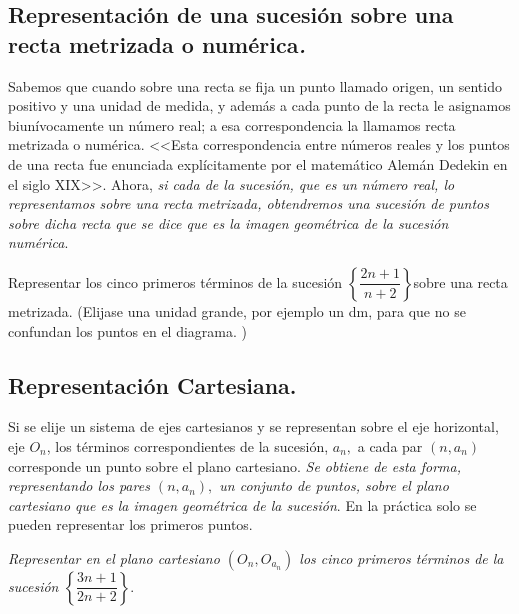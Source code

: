 \documentclass[oneside,english,spanish,2m,twoside,svgnames,x11names,HTML,twoside,12pt]{libro-matua}\usepackage[]{graphicx}\usepackage[]{color}
\begin{document}
\subsection{Representación de una sucesión sobre una recta metrizada o numérica\textsl{.}}
\begin{flushleft}
Sabemos que cuando sobre una recta se fija un punto llamado origen,
un sentido positivo y una unidad de medida, y además a cada punto
de la recta le asignamos biunívocamente un número real; a esa correspondencia
la llamamos recta metrizada o numérica. <<Esta correspondencia entre
números reales y los puntos de una recta fue enunciada explícitamente
por el matemático Alemán Dedekin en el siglo XIX>>.\linebreak{}
Ahora, \textsl{si cada de la sucesión, que es un número real, lo representamos
sobre una recta metrizada, obtendremos una sucesión de puntos sobre
dicha recta que se dice que es la imagen geométrica de la sucesión
numérica}.\textsl{\large{}}\linebreak{}
\begin{ejercicio} \vspace{1pt}
Representar los cinco primeros términos de la sucesión $\left\{ \dfrac{2n+1}{n+2}\right\} $sobre
una recta metrizada. (Elijase una unidad grande, por ejemplo un \si{dm},
para que no se confundan los puntos en el diagrama. )\end{ejercicio}
\par\end{flushleft}

\subsection{Representación Cartesiana.}
\begin{flushleft}
Si se elije un sistema de ejes cartesianos y se representan sobre
el eje horizontal, eje $O_{n}$, los términos correspondientes de
la sucesión, $a_{n},$ a cada par $\left(n,a_{n}\right)$ corresponde
un punto sobre el plano cartesiano. \textsl{Se obtiene de esta forma,
representando los pares $(n,a_{n}),$ un conjunto de puntos, sobre
el plano cartesiano que es la imagen geométrica de la sucesión}. \linebreak{}
En la práctica solo se pueden representar los primeros puntos.\linebreak{}
\begin{ejercicio}[]\textsl{Representar en el plano cartesiano $\left(O_{n},O_{a_{n}}\right)$
los cinco primeros términos de la sucesión $\left\{ \dfrac{3n+1}{2n+2}\right\} .$}\end{ejercicio}
\par\end{flushleft}
\end{document}
